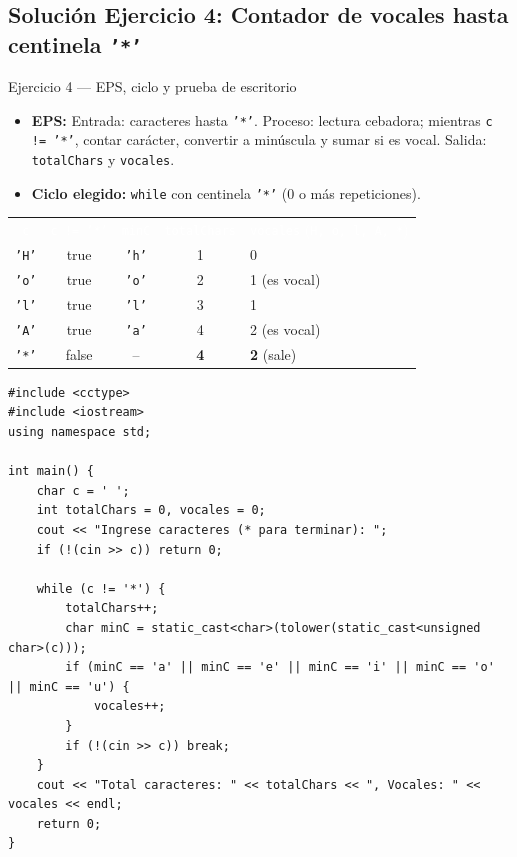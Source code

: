 \documentclass[11pt,letterpaper]{article}
\begin{document}
\subsection{Solución Ejercicio 4: Contador de vocales hasta centinela \texttt{'*'}}

\begin{solucion}{Ejercicio 4 --- EPS, ciclo y prueba de escritorio}
\begin{itemize}
  \item \textbf{EPS:} Entrada: caracteres hasta \texttt{'*'}. Proceso: lectura cebadora; mientras \texttt{c != '*'}, contar carácter, convertir a minúscula y sumar si es vocal. Salida: \texttt{totalChars} y \texttt{vocales}.
  \item \textbf{Ciclo elegido:} \texttt{while} con centinela \texttt{'*'} (0 o más repeticiones).
\end{itemize}
\begin{center}
\footnotesize
\renewcommand{\arraystretch}{1.15}
\begin{tabularx}{0.9\linewidth}{c c c c X}
\rowcolor{AzulMarino}
\textcolor{white}{\texttt{c}} & \textcolor{white}{\texttt{c != '*'}} & \textcolor{white}{\texttt{minC}} & \textcolor{white}{\texttt{totalChars}} & \textcolor{white}{\texttt{vocales} (\texttt{H, o, l, A, *})} \\
\texttt{'H'} & true & \texttt{'h'} & 1 & 0 \\
\texttt{'o'} & true & \texttt{'o'} & 2 & 1 (es vocal) \\
\texttt{'l'} & true & \texttt{'l'} & 3 & 1 \\
\texttt{'A'} & true & \texttt{'a'} & 4 & 2 (es vocal) \\
\texttt{'*'} & false & -- & \textbf{4} & \textbf{2} (sale) \\
\bottomrule
\end{tabularx}
\end{center}
\end{solucion}

\begin{lstlisting}[style=cppmonitoria,caption={Solución Ejercicio 4: Contador de vocales con centinela (C++)}]
#include <cctype>
#include <iostream>
using namespace std;

int main() {
    char c = ' ';
    int totalChars = 0, vocales = 0;
    cout << "Ingrese caracteres (* para terminar): ";
    if (!(cin >> c)) return 0;

    while (c != '*') {
        totalChars++;
        char minC = static_cast<char>(tolower(static_cast<unsigned char>(c)));
        if (minC == 'a' || minC == 'e' || minC == 'i' || minC == 'o' || minC == 'u') {
            vocales++;
        }
        if (!(cin >> c)) break;
    }
    cout << "Total caracteres: " << totalChars << ", Vocales: " << vocales << endl;
    return 0;
}
\end{lstlisting}
\end{document}
